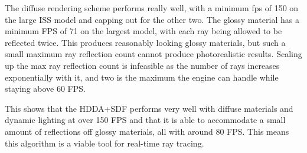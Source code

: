 The diffuse rendering scheme performs really well, with a minimum \acrshort{fps} of 150 on the large ISS model and capping out for the other two. The glossy material has a minimum FPS of 71 on the largest model, with each ray being allowed to be reflected twice. This produces reasonably looking glossy materials, but such a small maximum ray reflection count cannot produce photorealistic results. Scaling up the max ray reflection count is infeasible as the number of rays increases exponentially with it, and two is the maximum the engine can handle while staying above 60 FPS.

This shows that the HDDA+SDF performs very well with diffuse materials and dynamic lighting at over 150 FPS and that it is able to accommodate a small amount of reflections off glossy materials, all with around 80 FPS. This means this algorithm is a viable tool for real-time ray tracing.
